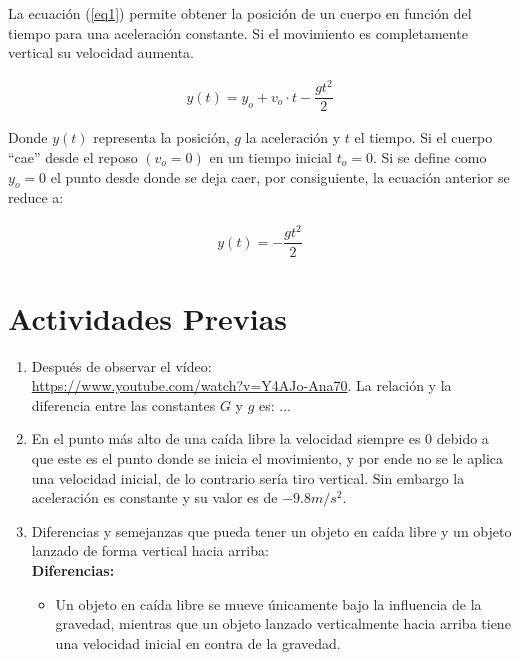 \begin{multicols}{2}
La ecuación (\ref{eq1}) permite obtener la posición de un cuerpo en función del tiempo para una aceleración constante. Si el movimiento es completamente vertical su velocidad aumenta.

\begin{align}\label{eq1}
    y(t) = y_o + v_o \cdot t  - \dfrac{g t^2}{2}
\end{align}

Donde $y(t)$ representa la posición, $g$ la aceleración y $t$ el tiempo. Si el cuerpo “cae” desde el reposo $(v_o = 0)$ en un tiempo inicial $t_o = 0$. Si se define como $y_o = 0$ el punto desde donde se deja caer, por consiguiente, la ecuación anterior se reduce a:

\begin{align} \label{eq2}
    y(t) = - \dfrac{g t^2}{2}
\end{align}

\section*{Actividades Previas}   
\begin{enumerate}
\item Después de observar el vídeo: \\ \href{https://www.youtube.com/watch?v=Y4AJo-Ana70}{https://www.youtube.com/watch?v=Y4AJo-Ana70}. La relación y la diferencia entre las constantes $G$ y $g$ es: ...
\item  En el punto más alto de una caída libre la velocidad siempre es 0 debido a que este es el punto donde se inicia el movimiento, y por ende no se le aplica una velocidad inicial, de lo contrario sería tiro vertical. 
        Sin embargo la aceleración es constante y su valor es de $-9.8 m/s^2$.
\item Diferencias y semejanzas que pueda tener un objeto en caída libre y un objeto lanzado de forma vertical hacia arriba:\\
    \textbf{Diferencias:}
    \begin{itemize}
        \item Un objeto en caída libre se mueve únicamente bajo la influencia de la gravedad, mientras que un objeto lanzado verticalmente hacia arriba tiene una velocidad inicial en contra de la gravedad.
    \end{itemize}


\end{enumerate}
\end{multicols}
